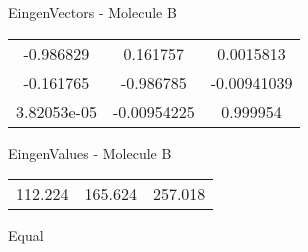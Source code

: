 \begin{multicols}{2}
\begin{center}
\vtab
 EingenVectors - Molecule B     \\
\vtab
\begin{tabular}{|c c c|}
-0.986829	 & 	0.161757	 & 	0.0015813	 \\
-0.161765	 & 	-0.986785	 & 	-0.00941039	 \\
3.82053e-05	 & 	-0.00954225	 & 	0.999954
\end{tabular}

\vtab
 EingenValues - Molecule B     \\
\vtab
\begin{tabular}{|c c c|}
112.224	 & 	165.624	 & 	257.018	 \\
\end{tabular}

\end{center}
\end{multicols}
\begin{center}
\vtab
\vtab
\textcolor{NavyBlue}{\Large Equal}
\end{center}

 \newpage

